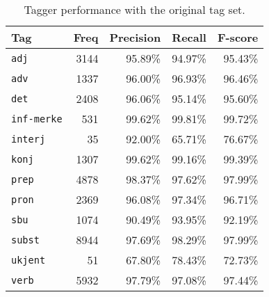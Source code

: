\documentclass[a4paper,12pt,english]{book}
\begin{document}
\begin{table}
    \centering
    \smaller[0.5]
    \begin{tabular}{@{}lrrrr@{}}
        \toprule
        \textbf{Tag} &  \textbf{Freq} & \textbf{Precision} & \textbf{Recall} &
        \textbf{F-score} \\
        \midrule
        \texttt{adj} & 3144 & 95.89\% & 94.97\% & 95.43\% \\
        \texttt{adv} & 1337 & 96.00\% & 96.93\% & 96.46\% \\
        \texttt{det} & 2408 & 96.06\% & 95.14\% & 95.60\% \\
        \texttt{inf-merke} & 531 & 99.62\% & 99.81\% & 99.72\% \\
        \texttt{interj} & 35 & 92.00\% & 65.71\% & 76.67\% \\
        \texttt{konj} & 1307 & 99.62\% & 99.16\% & 99.39\% \\
        \texttt{prep} & 4878 & 98.37\% & 97.62\% & 97.99\% \\
        \texttt{pron} & 2369 & 96.08\% & 97.34\% & 96.71\% \\
        \texttt{sbu} & 1074 & 90.49\% & 93.95\% & 92.19\% \\
        \texttt{subst} & 8944 & 97.69\% & 98.29\% & 97.99\% \\
        \texttt{ukjent} & 51 & 67.80\% & 78.43\% & 72.73\% \\
        \texttt{verb} & 5932 & 97.79\% & 97.08\% & 97.44\% \\
        \bottomrule
    \end{tabular}
    \caption{Tagger performance with the original tag set.}
    \label{baselinetagerror}
\end{table}
\end{document}
